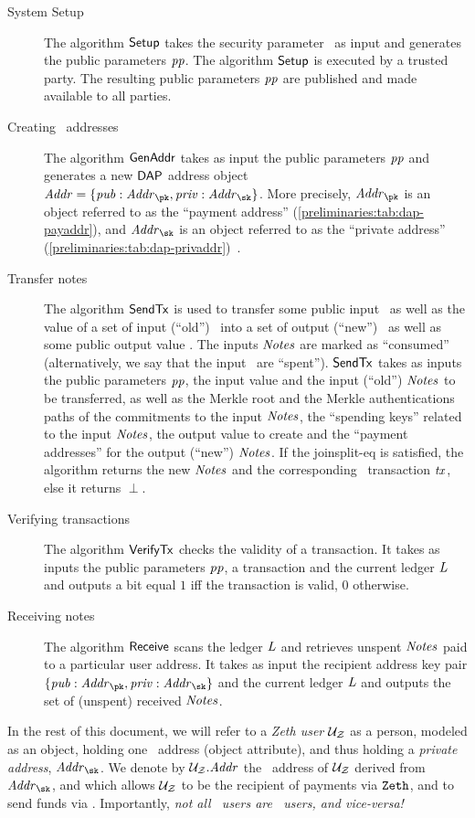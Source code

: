 \begin{description}
    \item[System Setup] The algorithm $\mathsf{Setup}$ takes the security parameter \secpar~as input and generates the public parameters $\mathit{pp}$. The algorithm $\mathsf{Setup}$ is executed by a trusted party. The resulting public parameters $\mathit{pp}$ are published and made available to all parties.
    \item[Creating \zeth~addresses] The algorithm $\mathsf{GenAddr}$ takes as input the public parameters $\mathit{pp}$ and generates a new $\mathsf{DAP}$ address object $\addr = \{\pubaddr: \addr_\pk, \privaddr: \addr_\sk\}$. More precisely, $\addr_\pk$ is an object referred to as the ``payment address'' (\cref{preliminaries:tab:dap-payaddr}), and $\addr_\sk$ is an object referred to as the ``private address'' (\cref{preliminaries:tab:dap-privaddr})~\cite{zcashprotocol}.
    \item[Transfer notes] The algorithm $\mathsf{SendTx}$ is used to transfer some public input \vin~as well as the value of a set of input (``old'') \notes~into a set of output (``new'') \notes~as well as some public output value \vout. The inputs $\mathit{Notes}$ are marked as ``consumed'' (alternatively, we say that the input \notes~are ``spent''). $\mathsf{SendTx}$ takes as inputs the public parameters $\mathit{pp}$, the input value and the input (``old'') $\mathit{Notes}$ to be transferred, as well as the Merkle root and the Merkle authentications paths of the commitments to the input $\mathit{Notes}$, the ``spending keys'' related to the input $\mathit{Notes}$, the output value to create and the ``payment addresses'' for the output (``new'') $\mathit{Notes}$. If the \gls{joinsplit-eq} is satisfied, the algorithm returns the new $\mathit{Notes}$ and the corresponding \ethereum~transaction $\mathit{tx}$, else it returns $\perp$.
    \item[Verifying transactions] The algorithm $\mathsf{VerifyTx}$ checks the validity of a transaction. It takes as inputs the public parameters $\mathit{pp}$, a transaction and the current ledger $\mathit{L}$ and outputs a bit equal $1$ iff the transaction is valid, $0$ otherwise.
    \item[Receiving notes] The algorithm $\mathsf{Receive}$ scans the ledger $\mathit{L}$ and retrieves unspent $\mathit{Notes}$ paid to a particular user address. It takes as input the recipient address key pair $\{\pubaddr: \addr_\pk, \privaddr: \addr_\sk\}$ and the current ledger $\mathit{L}$ and outputs the set of (unspent) received $\mathit{Notes}$.
\end{description}

\begin{notebox}
    In the rest of this document, we will refer to a \emph{Zeth user} $\mathcal{{U}_{Z}}$ as a person, modeled as an object, holding one \zeth~address (object attribute), and thus holding a \emph{private address}, $\addr_\sk$. We denote by $\mathcal{{U}_{Z}}.\mathit{Addr}$ the \zeth~address of $\mathcal{{U}_{Z}}$ derived from $\addr_\sk$, and which allows $\mathcal{{U}_{Z}}$ to be the recipient of payments via $\texttt{Zeth}$, and to send funds via \zeth. Importantly, \emph{not all \ethereum~users are \zeth~users, and vice-versa!}
\end{notebox}

